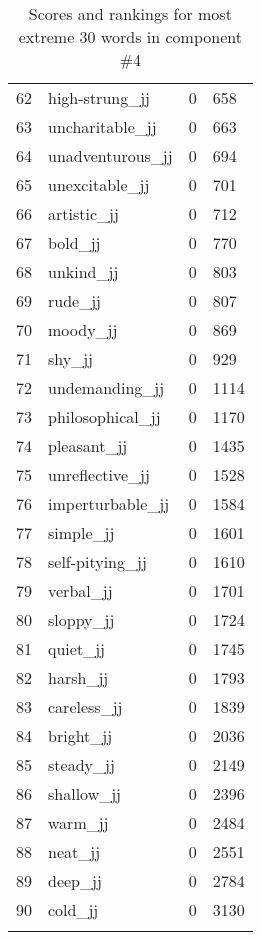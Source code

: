 \begin{longtable}[!htbp]{| rlr@{.}l |}
    62 & high-strung\_jj & 0 & 658 \\
    63 & uncharitable\_jj & 0 & 663 \\
    64 & unadventurous\_jj & 0 & 694 \\
    65 & unexcitable\_jj & 0 & 701 \\
    66 & artistic\_jj & 0 & 712 \\
    67 & bold\_jj & 0 & 770 \\
    68 & unkind\_jj & 0 & 803 \\
    69 & rude\_jj & 0 & 807 \\
    70 & moody\_jj & 0 & 869 \\
    71 & shy\_jj & 0 & 929 \\
    72 & undemanding\_jj & 0 & 1114 \\
    73 & philosophical\_jj & 0 & 1170 \\
    74 & pleasant\_jj & 0 & 1435 \\
    75 & unreflective\_jj & 0 & 1528 \\
    76 & imperturbable\_jj & 0 & 1584 \\
    77 & simple\_jj & 0 & 1601 \\
    78 & self-pitying\_jj & 0 & 1610 \\
    79 & verbal\_jj & 0 & 1701 \\
    80 & sloppy\_jj & 0 & 1724 \\
    81 & quiet\_jj & 0 & 1745 \\
    82 & harsh\_jj & 0 & 1793 \\
    83 & careless\_jj & 0 & 1839 \\
    84 & bright\_jj & 0 & 2036 \\
    85 & steady\_jj & 0 & 2149 \\
    86 & shallow\_jj & 0 & 2396 \\
    87 & warm\_jj & 0 & 2484 \\
    88 & neat\_jj & 0 & 2551 \\
    89 & deep\_jj & 0 & 2784 \\
    90 & cold\_jj & 0 & 3130 \\
    \hline
    \caption{Scores and rankings for most extreme 30 words in component \#4} \\
\end{longtable}
